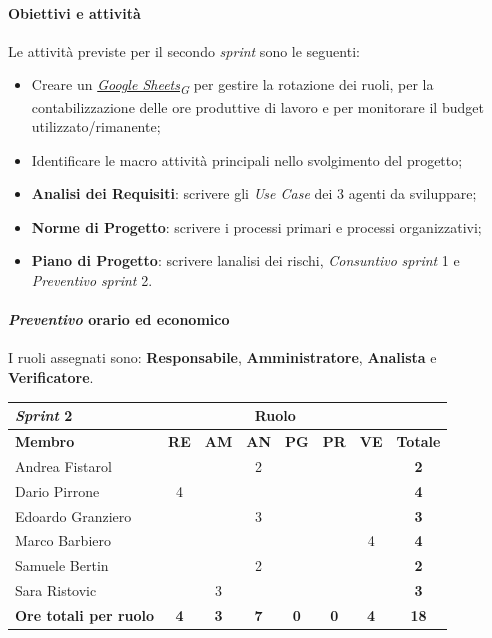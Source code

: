 \documentclass[12pt, a4paper]{article}
\newcommand{\urlglossario}{https://skynetunigroup.github.io/Code_Guardian/Documentazione/RTB/glossario_v1.0.0.pdf} %
\newcommand{\glo}[2]{\href{\urlglossario\#nameddest=#2}{#1\textsubscript{G}}}
\begin{document}
{\paragraph{Obiettivi e attività}

Le attività previste per il secondo \textit{sprint} sono le seguenti:

\begin{itemize}
\item
  Creare un \textit{\glo{Google Sheets}{google-sheets}} per gestire la rotazione dei ruoli, per
  la contabilizzazione delle ore produttive di lavoro e per monitorare
  il budget utilizzato/rimanente;
\item
  Identificare le macro attività principali nello svolgimento del
  progetto;
\item
  \textbf{Analisi dei Requisiti}: scrivere gli \textit{Use Case} dei 3
  agenti da sviluppare;
\item
  \textbf{Norme di Progetto}: scrivere i processi primari e processi
  organizzativi;
\item
  \textbf{Piano di Progetto}: scrivere l\textquotesingle analisi dei
  rischi, \textit{Consuntivo} \textit{sprint} 1 e \textit{Preventivo} \textit{sprint} 2.
\end{itemize}

\paragraph{\textit{Preventivo} orario ed economico}

I ruoli assegnati sono: \textbf{Responsabile}, \textbf{Amministratore}, \textbf{Analista} e \textbf{Verificatore}.
\begin{table}[H]
    \centering
    \renewcommand{\arraystretch}{1.3}
    \begin{tabularx}{0.9\textwidth}{|X|c|c|c|c|c|c|c|}
        \hline
        \textbf{\textit{Sprint} 2} & \multicolumn{6}{|c|}{\textbf{Ruolo}} & \\ \hline
        \textbf{Membro} & \textbf{RE} & \textbf{AM} & \textbf{AN} &
        \textbf{PG} & \textbf{PR} & \textbf{VE} & \textbf{Totale} \\ \hline
        Andrea Fistarol & & & 2 & & & &\textbf{2} \\ \hline
        Dario Pirrone & 4 & & & & & &\textbf{4} \\ \hline
        Edoardo Granziero & & & 3 & & & &\textbf{3} \\ \hline
        Marco Barbiero & & & & & & 4 &\textbf{4} \\ \hline
        Samuele Bertin & & & 2 & & & &\textbf{2} \\ \hline
        Sara Ristovic & & 3 & & & & &\textbf{3} \\ \hline
        \textbf{Ore totali per ruolo} & \textbf{4} & \textbf{3} &
        \textbf{7} & \textbf{0} & \textbf{0} & \textbf{4} & \textbf{18}\\ \hline
 

\end{tabularx}
\end{table}}
\end{document}
